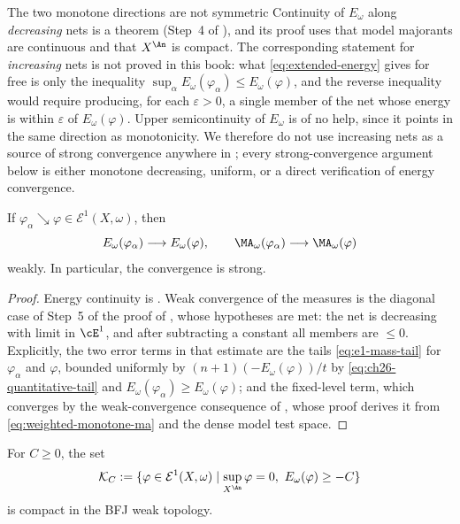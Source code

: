 \begin{warning}{The two monotone directions are not symmetric}
Continuity of $E_\omega$ along \emph{decreasing} nets is a theorem
(Step~4 of ), and its proof uses that model
majorants are continuous and that $X^{\An}$ is compact.  The corresponding
statement for \emph{increasing} nets is not proved in this book: what
\eqref{eq:extended-energy} gives for free is only the inequality
$\sup_\alpha E_\omega(\varphi_\alpha)\leq E_\omega(\varphi)$, and the
reverse inequality would require producing, for each $\varepsilon>0$, a
single member of the net whose energy is within $\varepsilon$ of
$E_\omega(\varphi)$.  Upper semicontinuity of $E_\omega$ is of no help,
since it points in the same direction as monotonicity.  We therefore do not
use increasing nets as a source of strong convergence anywhere in
; every strong-convergence argument below is either monotone
decreasing, uniform, or a direct verification of energy convergence.
\end{warning}

\begin{proposition}\label{prop:e1-monotone-continuity}
If $\varphi_\alpha\searrow\varphi\in\mathcal E^1(X,\omega)$, then
\[
 E_\omega(\varphi_\alpha)\longrightarrow E_\omega(\varphi),
\qquad
 \MA_\omega(\varphi_\alpha)\longrightarrow\MA_\omega(\varphi)
\]
weakly. In particular, the convergence is strong.
\end{proposition}

\begin{proof}
Energy continuity is .  Weak convergence of
the measures is the diagonal case of Step~5 of the proof of
, whose hypotheses are met: the net is decreasing
with limit in $\cE^1$, and after subtracting a constant all members are
$\leq0$.  Explicitly, the two error terms in that estimate are the tails
\eqref{eq:e1-mass-tail} for $\varphi_\alpha$ and $\varphi$, bounded
uniformly by $(n+1)(-E_\omega(\varphi))/t$ by
\eqref{eq:ch26-quantitative-tail} and $E_\omega(\varphi_\alpha)\geq
E_\omega(\varphi)$; and the fixed-level term, which converges by
the weak-convergence consequence of
, whose proof derives it from
\eqref{eq:weighted-monotone-ma} and the dense model test space.
\end{proof}

\begin{proposition}\label{prop:e1-compact-superlevels}
For $C\geq0$, the set
\begin{equation}
\label{eq:normalized-energy-superlevel}
 \mathcal K_C:=
 \{\varphi\in\mathcal E^1(X,\omega)\mid
   \sup_{X^{\An}}\varphi=0,\ E_\omega(\varphi)\geq-C\}
\end{equation}
is compact in the BFJ weak topology.
\end{proposition}

